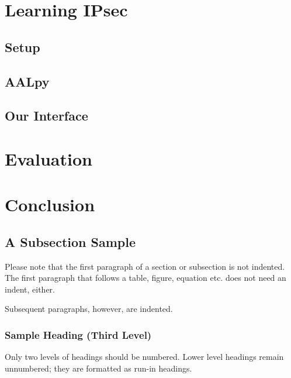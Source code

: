 \documentclass[runningheads]{llncs}
\begin{document}
\section{Learning IPsec} \label{chap:4} %
\subsection{Setup}
\subsection{AALpy}
\subsection{Our Interface}

\section{Evaluation} \label{chap:5}
\section{Conclusion} \label{chap:6}

\subsection{A Subsection Sample}
Please note that the first paragraph of a section or subsection is
not indented. The first paragraph that follows a table, figure,
equation etc. does not need an indent, either.

Subsequent paragraphs, however, are indented.

\subsubsection{Sample Heading (Third Level)} Only two levels of
headings should be numbered. Lower level headings remain unnumbered;
they are formatted as run-in headings.
\end{document}
